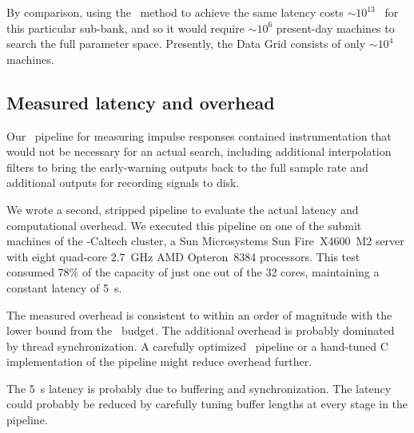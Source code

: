 By comparison, using the \TD\ method to achieve the same latency costs
$\sim$$10^{13}$ \flops\ for this particular sub-bank, and so it would require
$\sim$$10^6$ present-day machines to search the full parameter space.
Presently, the \LIGO{} Data Grid consists of only $\sim$$10^4$ machines.

\subsection{Measured latency and overhead}

Our \gstreamer\ pipeline for measuring impulse responses contained instrumentation that would not be necessary for an actual search, including additional interpolation filters to bring the early-warning outputs back to the full sample rate and additional outputs for recording signals to disk.

We wrote a second, stripped pipeline to evaluate the actual latency and computational overhead.  We executed this pipeline on one of the submit machines of the \LIGO-Caltech cluster, a Sun Microsystems Sun Fire\texttrademark\ X4600~M2 server with eight quad-core 2.7~GHz AMD Opteron\texttrademark\ 8384 processors.  This test consumed 78\% of the capacity of just one out of the 32 cores, maintaining a constant latency of 5~s.

The measured overhead is consistent to within an order of magnitude with the lower bound from the \flops\ budget.  The additional overhead is probably dominated by thread synchronization.  A carefully optimized \gstreamer\ pipeline or a hand-tuned C implementation of the pipeline might reduce overhead further.

The 5~s latency is probably due to buffering and synchronization.  The latency could probably be reduced by carefully tuning buffer lengths at every stage in the pipeline.
